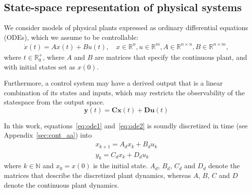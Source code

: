 \documentclass[sigconf]{llncs}
\newcommand{\mat}[1]{\boldsymbol{#1}}
\renewcommand{\vec}[1]{\boldsymbol{#1}}
\begin{document}
\subsection{State-space representation of physical systems}
\label{sec:ssrepresentation}


We consider models of physical plants expressed as ordinary differential
equations (ODEs), which we assume to be controllable:
%
\begin{align}
\label{eq:ode1}
\dot{x}(t) = Ax(t)+ B u(t), \quad x \in \mathbb{R}^{n}, u \in \mathbb{R}^m, A \in \mathbb{R}^{n \times n}, B \in \mathbb{R}^{n \times m}, 
\end{align}
%
where $t \in \mathbb R_0^+$, where $A$ and $B$ are matrices that 
specify the continuous plant, and with initial states set as $x(0)$.

Furthermore, a control system may have a derived
output that is a linear combination of its states and inputs, which may
restricts the observability of the statespace from the output space.
\begin{equation}
\label{eq:ode2}  
\vec{y}(t)=\mat{C}\vec{x}(t)+\mat{D}\vec{u}(t)
\end{equation}

In this work, equations~\eqref{eq:ode1} and~\eqref{eq:ode2} is soundly discretized in time (see Appendix~\ref{sec:cont_aa})  into
\begin{align}
\label{eq:plant}
x_{k+1} = A_d x_k+ B_d u_k\\
y_{k} = C_d x_k + D_d u_k
\end{align} 
%
where $k \in \mathbb N$ and $x_{0}=x(0)$ is the initial state. 
$A_d$, $B_d$, $C_d$ and $D_d$ denote the matrices that describe the discretized plant dynamics, whereas $A$, $B$, $C$ and $D$ denote the continuous plant dynamics.  
\end{document}
